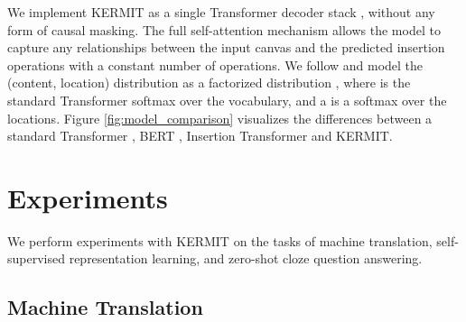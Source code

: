 \documentclass{article}
\begin{document}
We implement KERMIT as a single Transformer decoder stack \citep{vaswani-nips-2017}, without any form of causal masking. The full self-attention mechanism allows the model to capture any relationships between the input canvas and the predicted insertion operations with a constant number of operations. We follow \citet{stern-icml-2019} and model the (content, location) distribution  as a factorized distribution , where  is the standard Transformer softmax over the vocabulary, and a  is a softmax over the locations. Figure \ref{fig:model_comparison} visualizes the differences between a standard Transformer \citep{vaswani-nips-2017}, BERT \citep{devlin-naacl-2019}, Insertion Transformer \citep{stern-icml-2019} and KERMIT.
 \section{Experiments}
We perform experiments with KERMIT on the tasks of machine translation, self-supervised representation learning, and zero-shot cloze question answering.

\subsection{Machine Translation}
\label{sec:machinetranslation}
\end{document}
